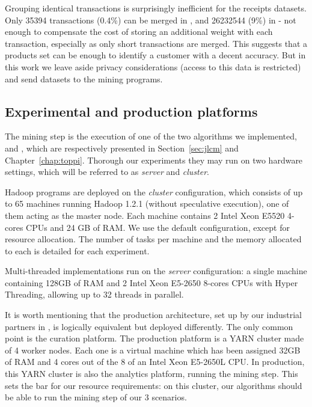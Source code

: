 Grouping identical transactions is surprisingly inefficient for the receipts datasets.
Only \num{35394} transactions (0.4\%) can be merged in \prodassocclient,
and \num{26232544} (9\%) in  \prodassocreceipt -
not enough to compensate the cost of storing an additional weight with each transaction,
especially as only short transactions are merged.
This suggests that a products set can be enough to identify a customer with a decent accuracy.
But in this work we leave aside privacy considerations (access to this data is restricted)
and send datasets to the mining programs.



\subsection{Experimental and production platforms}
\label{sec:datalyse:prod}

The mining step is the execution of one of the two algorithms we implemented, \jlcm and \toppi,
which are respectively presented in Section~\ref{sec:jlcm} and Chapter~\ref{chap:toppi}.
Thorough our experiments they may run on two hardware settings,
which will be referred to as \textit{server} and \textit{cluster}.

Hadoop programs are deployed on the \textit{cluster} configuration,
which consists of up to 65 machines running Hadoop 1.2.1 (without speculative execution),
one of them acting as the master node.
Each machine contains 2 Intel Xeon E5520 4-cores CPUs and 24 GB of RAM.
We use the default configuration, except for resource allocation.
The number of tasks per machine and the memory allocated to each is detailed for each experiment.

Multi-threaded implementations run on the \textit{server} configuration:
a single machine containing 128GB of RAM and 2 Intel Xeon E5-2650 8-cores CPUs with Hyper Threading,
allowing up to 32 threads in parallel.

It is worth mentioning that the production architecture, set up by our industrial partners in \datalyse,
is logically equivalent but deployed differently.
The only common point is the curation platform.
The production platform is a YARN cluster made of 4 worker nodes.
Each one is a virtual machine which has been assigned 32GB of RAM and
4 cores out of the 8 of an Intel Xeon E5-2650L CPU.
In production, this YARN cluster is also the analytics platform, running the mining step.
This sets the bar for our resource requirements:
on this cluster, our algorithms should be able to run the mining step of our 3 scenarios.


